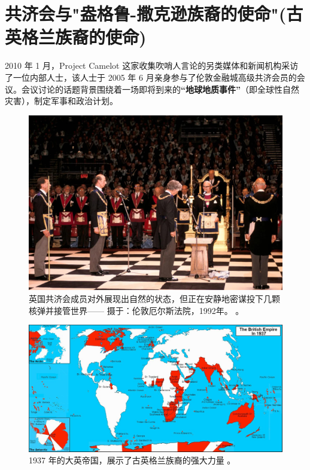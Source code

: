 \documentclass[10pt,twocolumn,letterpaper]{article}
\begin{document}
\section{共济会与"盎格鲁-撒克逊族裔的使命"(古英格兰族裔的使命)}

2010 年 1 月，Project Camelot 这家收集吹哨人言论的另类媒体和新闻机构采访了\cite{4,6}一位内部人士，该人士于 2005 年 6 月亲身参与了伦敦金融城高级共济会员的会议。会议讨论的话题背景围绕着一场即将到来的\textbf{“地球地质事件”}（即全球性自然灾害），制定军事和政治计划。

\begin{figure}[b]
\begin{center}
   \includegraphics[width=1\linewidth]{freemason.jpg}

\end{center}
   \caption{英国共济会成员对外展现出自然的状态，但正在安静地密谋投下几颗核弹并接管世界—— 摄于：伦敦厄尔斯法院，1992年。 \cite{5}。}
\label{fig:1}
\label{fig:onecol}
\end{figure}

\begin{figure}[t]
\begin{center}
\includegraphics[width=1\textwidth]{british.jpg}
\end{center}
   \caption{1937 年的大英帝国，展示了古英格兰族裔的强大力量 \cite{14}。}
   \label{fig:2}
\end{figure}
\end{document}
